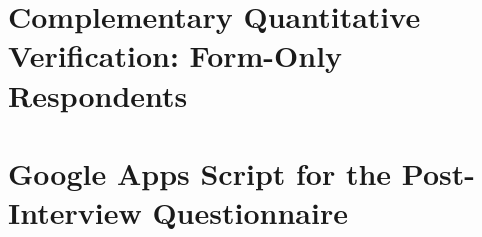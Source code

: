 \documentclass[msc, eng]{ita}    %
\begin{document}
\chapter{Complementary Quantitative Verification: Form-Only Respondents}
\label{ape:questionnaire-only}


\annex
\chapter{Google Apps Script for the Post-Interview Questionnaire}
\label{ane:appsscript}



\end{document}
